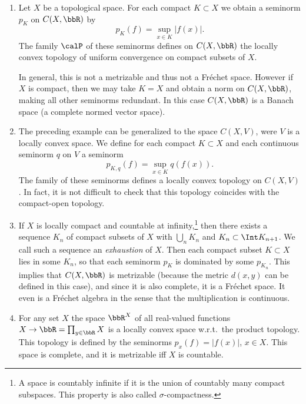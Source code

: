 \begin{example}
    \begin{enumerate}[label=(\alph*)]
        \item Let $X$ be a topological space. For each compact $K\subset X$ we obtain a seminorm $p_K$ on $C(X,\bbR)$ by
        \[p_K(f)=\sup_{x\in K}|f(x)|.\]
        The family $\calP$ of these seminorms defines on $C(X,\bbR)$ the locally convex topology of uniform convergence on compact subsets of $X$. 
        
        In general, this is not a metrizable and thus not a Fr\'echet space. However if $X$ is compact, then we may take $K=X$ and obtain a norm on $C(X,\bbR)$, making all other seminorms redundant. In this case $C(X,\bbR)$ is a Banach space (a complete normed vector space).
        \item The preceding example can be generalized to the space $C(X,V)$, were $V$ is a locally convex space. We define for each compact $K\subset X$ and each continuous seminorm $q$ on $V$ a seminorm
        \[p_{K,q}(f)=\sup_{x\in K} q(f(x)).\]
        The family of these seminorms defines a locally convex topology on $C(X,V)$. In fact, it is not difficult to check that this topology coincides with the compact-open topology.
        \item If $X$ is locally compact and countable at infinity,\footnote{A space is countably infinite if it is the union of countably many compact subspaces. This property is also called $\sigma$-compactness.} then there exists a sequence $K_n$ of compact subsets of $X$ with $\bigcup_n K_n$ and $K_n\subset \Int K_{n+1}$. We call such a sequence an \emph{exhaustion} of $X$. Then each compact subset $K\subset X$ lies in some $K_n$, so that each seminorm $p_K$ is dominated by some $p_{K_n}$. This implies that $C(X,\bbR)$ is metrizable (because the metric $d(x,y)$ can be defined in this case), and since it is also complete, it is a Fr\'echet space. It even is a Fr\'echet algebra in the sense that the multiplication is continuous.
        \item For any set $X$ the space $\bbR^X$ of all real-valued functions $X\to \bbR=\prod_{y\in \bbR} X$ is a locally convex space w.r.t.\ the product topology. This topology is defined by the seminorms $p_x(f)=|f(x)|$, $x\in X$. This space is complete, and it is metrizable iff $X$ is countable.
    \end{enumerate}
\end{example}

